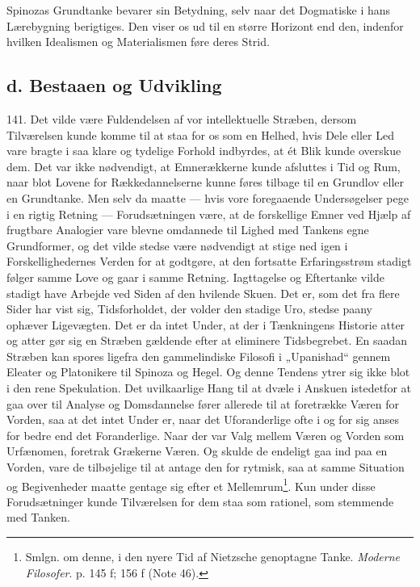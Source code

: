\documentclass[12pt,a4paper]{book}
\newcommand{\apage}[1]{\marginnote{\footnotesize\textit{[#1]}}}
\begin{document}
Spinozas Grundtanke bevarer sin Betydning, selv naar det Dogmatiske i hans Lærebygning
berigtiges. Den viser os ud til en større Horizont end den, indenfor hvilken Idealismen og
Materialismen føre deres Strid.

\subsection*{d. Bestaaen og Udvikling}

141. Det vilde være Fuldendelsen af vor intellektuelle Stræben, dersom Tilværelsen kunde
komme til at staa for os som en Helhed, hvis Dele eller Led vare bragte i saa klare og
tydelige Forhold indbyrdes, at ét Blik kunde overskue dem. Det var ikke nødvendigt, at
Emnerækkerne kunde afsluttes i Tid og Rum, naar blot Lovene for Rækkedannelserne kunne
føres tilbage til en Grundlov eller en Grundtanke. Men selv da maatte --- hvis vore
foregaaende Undersøgelser pege i en rigtig Retning --- Forudsætningen være, at de
forskellige Emner ved Hjælp af frugtbare Analogier vare blevne omdannede til Lighed med
Tankens egne Grundformer, og det vilde stedse være nødvendigt at stige ned igen i
Forskellighedernes Verden for at godtgøre, at den fortsatte Erfaringsstrøm stadigt følger
samme Love og gaar i samme Retning. Iagttagelse og Eftertanke vilde stadigt have Arbejde ved Siden af den hvilende Skuen. Det er, som det fra flere Sider har vist sig, Tidsforholdet,
der volder den stadige Uro, stedse paany ophæver Ligevægten. Det er da intet Under, at der
i Tænkningens Historie atter og atter gør sig en Stræben gældende efter at eliminere
Tidsbegrebet. En saadan Stræben kan spores ligefra den gammelindiske Filosofi i
„Upanishad“ gennem Eleater og Platonikere til Spinoza og Hegel. Og denne Tendens ytrer sig \apage{339}
ikke blot i den rene Spekulation. Det uvilkaarlige Hang til at dvæle i Anskuen istedetfor
at gaa over til Analyse og Domsdannelse fører allerede til at foretrække Væren for Vorden,
saa at det intet Under er, naar det Uforanderlige ofte i og for sig anses for bedre end det
Foranderlige. Naar der var Valg mellem Væren og Vorden som Urfænomen, foretrak Grækerne
Væren. Og skulde de endeligt gaa ind paa en Vorden, vare de tilbøjelige til at antage den
for rytmisk, saa at samme Situation og Begivenheder maatte gentage sig efter et
Mellemrum\footnote{Smlgn. om denne, i den nyere Tid af Nietzsche genoptagne Tanke.
\emph{Moderne Filosofer}. p. 145 f; 156 f (Note 46).}. Kun under disse Forudsætninger kunde
Tilværelsen for dem staa som rationel, som stemmende med Tanken.
\end{document}
